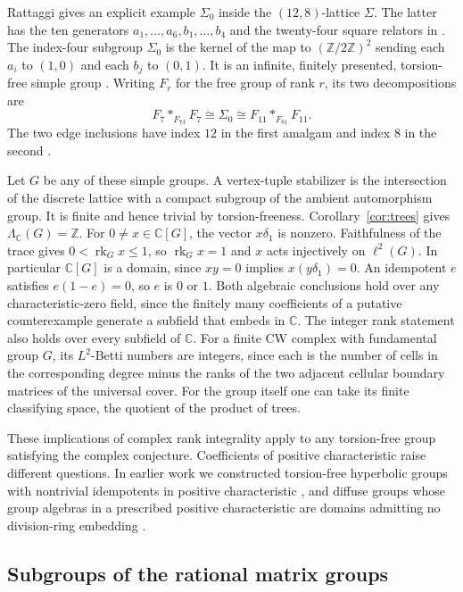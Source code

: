 \documentclass[11pt,a4paper,reqno]{amsart}
\numberwithin{equation}{section}
\theoremstyle{remark}
\newcommand{\C}{\mathbb C}
\newcommand{\Z}{\mathbb Z}
\newcommand{\rk}{\operatorname{rk}}
\begin{document}
Rattaggi gives an explicit example \(\Sigma_0\) inside the
\((12,8)\)-lattice \(\Sigma\). The latter has the ten generators
\(a_1,\ldots,a_6,b_1,\ldots,b_4\) and the twenty-four square relators in
\cite[Example~3.4]{Rattaggi}. The index-four subgroup \(\Sigma_0\) is the
kernel of the map to \((\Z/2\Z)^2\) sending each \(a_i\) to \((1,0)\)
and each \(b_j\) to \((0,1)\). It is an infinite, finitely presented,
torsion-free simple group \cite[\S1 and Theorem~3.5]{Rattaggi}.
Writing \(F_r\) for the free group of rank \(r\), its two decompositions are
\[
     F_7*_{F_{73}}F_7 \cong \Sigma_0 \cong F_{11}*_{F_{81}}F_{11}.
\]
The two edge inclusions have index \(12\) in the first amalgam and
index \(8\) in the second
\cite[Proposition~1.4 and Theorem~2.47(4)]{RattaggiThesis}.

Let \(G\) be any of these simple groups. A vertex-tuple stabilizer is
the intersection of the discrete lattice with a compact subgroup of
the ambient automorphism group. It is finite and hence trivial by
torsion-freeness. Corollary~\ref{cor:trees} gives
\(\Lambda_{\C}(G)=\Z\). For \(0\ne x\in\C[G]\), the vector
\(x\delta_1\) is nonzero. Faithfulness of the trace gives
\(0<\rk_G x\leq 1\), so \(\rk_G x=1\) and \(x\) acts injectively
on \(\ell^2(G)\). In particular \(\C[G]\) is a domain, since
\(xy=0\) implies \(x(y\delta_1)=0\). An idempotent \(e\) satisfies
\(e(1-e)=0\), so \(e\) is \(0\) or \(1\).
Both algebraic conclusions hold over any characteristic-zero field,
since the finitely many coefficients of a putative counterexample
generate a subfield that embeds in \(\C\).
The integer rank statement also holds over every subfield of \(\C\).
For a finite CW complex with fundamental group \(G\), its
\(L^2\)-Betti numbers are integers, since each is the number of cells
in the corresponding degree minus the ranks of the two adjacent
cellular boundary matrices of the universal cover. For the group
itself one can take its finite classifying space, the quotient of
the product of trees.

\noindent
These implications of complex rank integrality apply to any torsion-free group satisfying the complex conjecture. Coefficients of positive characteristic raise different questions. In earlier work we constructed torsion-free hyperbolic groups with nontrivial idempotents in positive characteristic \cite{MDKap}, and diffuse groups whose group algebras in a prescribed positive characteristic are domains admitting no division-ring embedding \cite{MDDomain}.

\subsection{Subgroups of the rational matrix groups}
\end{document}
